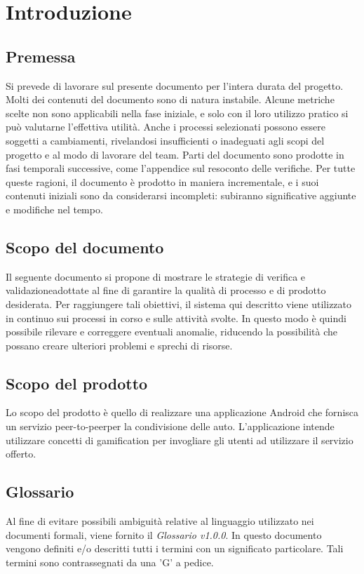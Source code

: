 \section{Introduzione}
\subsection{Premessa}
Si prevede di lavorare sul presente documento per l'intera durata del progetto. 
Molti dei contenuti del documento sono di natura instabile. \newline
Alcune metriche scelte non sono applicabili nella fase iniziale, e solo con il loro utilizzo pratico si può valutarne l'effettiva utilità. Anche i processi selezionati possono essere soggetti a cambiamenti, rivelandosi insufficienti o inadeguati agli scopi del progetto e al modo di lavorare del team.\newline 
Parti del documento sono prodotte in fasi temporali successive, come l'appendice sul resoconto delle verifiche.\newline 
Per tutte queste ragioni, il documento è prodotto in maniera incrementale, e i suoi contenuti iniziali sono da considerarsi incompleti: subiranno significative aggiunte e modifiche nel tempo.
\subsection{Scopo del documento}
Il seguente documento si propone di mostrare le strategie di verifica e validazione\glosp adottate al fine di garantire la qualità di processo e di prodotto desiderata. \newline
Per raggiungere tali obiettivi, il sistema qui descritto viene utilizzato in continuo sui processi in corso e sulle attività svolte. In questo modo è quindi possibile rilevare e correggere eventuali anomalie, riducendo la possibilità che possano creare ulteriori problemi e sprechi di risorse. 
\subsection{Scopo del prodotto}
Lo scopo del prodotto è quello di realizzare una applicazione Android che fornisca un servizio peer-to-peer\glosp per la condivisione delle auto. L'applicazione intende utilizzare concetti di gamification per invogliare gli utenti ad utilizzare il servizio offerto.
\subsection{Glossario}
Al fine di evitare possibili ambiguità relative al linguaggio utilizzato nei documenti formali, viene fornito il \textit{Glossario v1.0.0}. In questo documento vengono definiti e/o descritti tutti i termini con un significato particolare. Tali termini sono contrassegnati da una 'G' a pedice.
